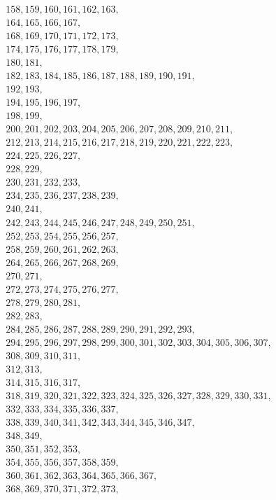 \documentclass{ltxdoc}
\begin{document}
\begin{multline}
158, 159, 160, 161, 162, 163, \\
164, 165, 166, 167, \\
168, 169, 170, 171, 172, 173, \\
174, 175, 176, 177, 178, 179, \\
180, 181, \\
182, 183, 184, 185, 186, 187, 188, 189, 190, 191, \\
192, 193, \\
194, 195, 196, 197, \\
198, 199, \\
200, 201, 202, 203, 204, 205, 206, 207, 208, 209, 210, 211, \\
212, 213, 214, 215, 216, 217, 218, 219, 220, 221, 222, 223, \\
224, 225, 226, 227, \\
228, 229, \\
230, 231, 232, 233, \\
234, 235, 236, 237, 238, 239, \\
240, 241, \\
242, 243, 244, 245, 246, 247, 248, 249, 250, 251, \\
252, 253, 254, 255, 256, 257, \\
258, 259, 260, 261, 262, 263, \\
264, 265, 266, 267, 268, 269, \\
270, 271, \\
272, 273, 274, 275, 276, 277, \\
278, 279, 280, 281, \\
282, 283, \\
284, 285, 286, 287, 288, 289, 290, 291, 292, 293, \\
294, 295, 296, 297, 298, 299, 300, 301, 302, 303, 304, 305, 306, 307, \\
308, 309, 310, 311, \\
312, 313, \\
314, 315, 316, 317, \\
318, 319, 320, 321, 322, 323, 324, 325, 326, 327, 328, 329, 330, 331, \\
332, 333, 334, 335, 336, 337, \\
338, 339, 340, 341, 342, 343, 344, 345, 346, 347, \\
348, 349, \\
350, 351, 352, 353, \\
354, 355, 356, 357, 358, 359, \\
360, 361, 362, 363, 364, 365, 366, 367, \\
368, 369, 370, 371, 372, 373, \\

\end{multline}
\end{document}
